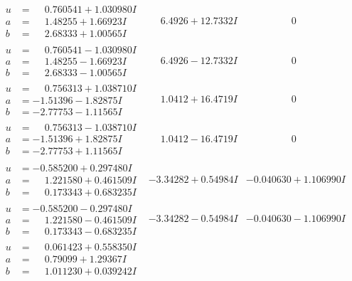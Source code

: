 \documentclass[1p]{elsarticle_modified}
\theoremstyle{definition}
\begin{document}
$$\begin{array}{c|c|c}
\begin{aligned}
u &= \phantom{-}0.760541 + 1.030980 I \\
a &= \phantom{-}1.48255 + 1.66923 I \\
b &= \phantom{-}2.68333 + 1.00565 I\end{aligned}
 & \phantom{-}6.4926 + 12.7332 I & \phantom{-0.000000 } 0 \\ \hline\begin{aligned}
u &= \phantom{-}0.760541 - 1.030980 I \\
a &= \phantom{-}1.48255 - 1.66923 I \\
b &= \phantom{-}2.68333 - 1.00565 I\end{aligned}
 & \phantom{-}6.4926 - 12.7332 I & \phantom{-0.000000 } 0 \\ \hline\begin{aligned}
u &= \phantom{-}0.756313 + 1.038710 I \\
a &= -1.51396 - 1.82875 I \\
b &= -2.77753 - 1.11565 I\end{aligned}
 & \phantom{-}1.0412 + 16.4719 I & \phantom{-0.000000 } 0 \\ \hline\begin{aligned}
u &= \phantom{-}0.756313 - 1.038710 I \\
a &= -1.51396 + 1.82875 I \\
b &= -2.77753 + 1.11565 I\end{aligned}
 & \phantom{-}1.0412 - 16.4719 I & \phantom{-0.000000 } 0 \\ \hline\begin{aligned}
u &= -0.585200 + 0.297480 I \\
a &= \phantom{-}1.221580 + 0.461509 I \\
b &= \phantom{-}0.173343 + 0.683235 I\end{aligned}
 & -3.34282 + 0.54984 I & -0.040630 + 1.106990 I \\ \hline\begin{aligned}
u &= -0.585200 - 0.297480 I \\
a &= \phantom{-}1.221580 - 0.461509 I \\
b &= \phantom{-}0.173343 - 0.683235 I\end{aligned}
 & -3.34282 - 0.54984 I & -0.040630 - 1.106990 I \\ \hline\begin{aligned}
u &= \phantom{-}0.061423 + 0.558350 I \\
a &= \phantom{-}0.79099 + 1.29367 I \\
b &= \phantom{-}1.011230 + 0.039242 I\end{aligned}

\end{array}$$
\end{document}
